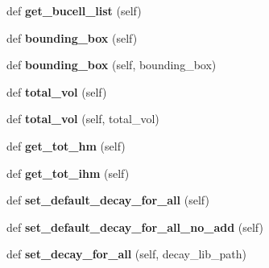 \begin{DoxyCompactItemize}
\item 
\mbox{\label{classonix_1_1system_1_1System_a4aa04e09c57e78d7f33da2fcecb9b53a}} 
def {\bfseries get\+\_\+bucell\+\_\+list} (self)
\item 
\mbox{\label{classonix_1_1system_1_1System_a4788ebf25c8a1e7863b11af66ea859c6}} 
def {\bfseries bounding\+\_\+box} (self)
\item 
\mbox{\label{classonix_1_1system_1_1System_a8f95ed9e722e2cc294256558305d68bd}} 
def {\bfseries bounding\+\_\+box} (self, bounding\+\_\+box)
\item 
\mbox{\label{classonix_1_1system_1_1System_ac69b97300921d139b2bd57d1578e8e29}} 
def {\bfseries total\+\_\+vol} (self)
\item 
\mbox{\label{classonix_1_1system_1_1System_a527f3a412f75429ff54191898cf765ef}} 
def {\bfseries total\+\_\+vol} (self, total\+\_\+vol)
\item 
\mbox{\label{classonix_1_1system_1_1System_a831148f84bb68736e06de7bb3d6a4f23}} 
def {\bfseries get\+\_\+tot\+\_\+hm} (self)
\item 
\mbox{\label{classonix_1_1system_1_1System_a9f5a2581072b60860f6d493a6f4c65f6}} 
def {\bfseries get\+\_\+tot\+\_\+ihm} (self)
\item 
\mbox{\label{classonix_1_1system_1_1System_a6fdc8d88e94307cc15218db9af70f180}} 
def {\bfseries set\+\_\+default\+\_\+decay\+\_\+for\+\_\+all} (self)
\item 
\mbox{\label{classonix_1_1system_1_1System_a87a02c492ede21dd762844f8b02730ce}} 
def {\bfseries set\+\_\+default\+\_\+decay\+\_\+for\+\_\+all\+\_\+no\+\_\+add} (self)
\item 
\mbox{\label{classonix_1_1system_1_1System_a5b69f8149ab3f21c178a806162be872f}} 
def {\bfseries set\+\_\+decay\+\_\+for\+\_\+all} (self, decay\+\_\+lib\+\_\+path)

\end{DoxyCompactItemize}
